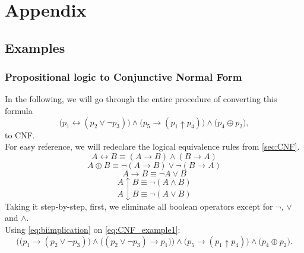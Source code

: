 \section{Appendix}
\subsection{Examples}
\subsubsection{Propositional logic to Conjunctive Normal Form}
In the following, we will go through the entire procedure of converting this formula
\begin{equation}\label{eq:CNF_example1}
    \Big(
        p_1 \leftrightarrow (
            p_2 \vee \neg p_3
        )
    \Big) \wedge \Big(
        p_5 \rightarrow (
            p_1 \uparrow p_4
        )
    \Big) \wedge \Big(
        p_4 \oplus p_2
    \Big),
\end{equation}
 to CNF.
\\
For easy reference, we will redeclare the logical equivalence rules from \autoref{sec:CNF}.
\begin{equation}\label{eq:biimplication}
    A \leftrightarrow B \equiv (A \rightarrow  B) \wedge (B \rightarrow A)
\end{equation}
\begin{equation}\label{eq:XOR}
    A \oplus B \equiv \neg (A \rightarrow B) \vee \neg (B \rightarrow A)
\end{equation}
\begin{equation}\label{eq:implication}
    A \rightarrow B \equiv \neg A \vee B
\end{equation}
\begin{equation}\label{eq:NAND}
    A \uparrow B \equiv \neg (A \wedge B)
\end{equation}
\begin{equation}\label{NOR}
    A \downarrow B \equiv \neg (A \vee B)
\end{equation}
Taking it step-by-step, first, we eliminate all boolean operators except for $\neg$, $\vee$ and $\wedge$.
\\
Using \autoref{eq:biimplication} on \autoref{eq:CNF_example1}:
\begin{equation}\label{eq:CNF_example2}
    \bigg(
        \Big(
            p_1 \rightarrow (
                p_2 \vee \neg p_3
            )
        \Big) \wedge \Big(
                (
                    p_2 \vee \neg p_3 
                ) \rightarrow p_1 
            \Big)
    \bigg) \wedge \Big(
        p_5 \rightarrow (
            p_1 \uparrow p_4
        )
    \Big) \wedge \Big(
        p_4 \oplus p_2
    \Big).
\end{equation}
